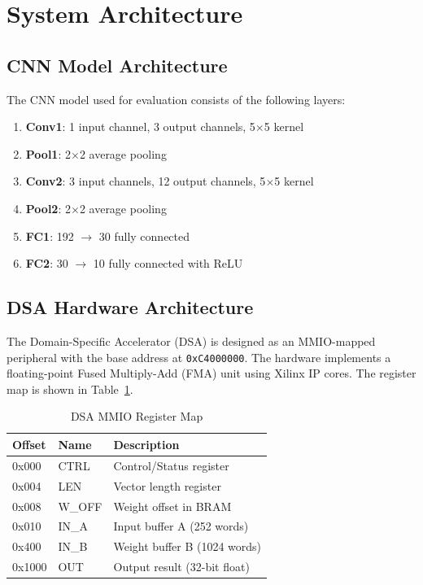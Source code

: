 \documentclass[conference]{IEEEtran}
\begin{document}
\section{System Architecture}


\subsection{CNN Model Architecture}

The CNN model used for evaluation consists of the following layers:

\begin{enumerate}
    \item \textbf{Conv1}: 1 input channel, 3 output channels, 5$\times$5 kernel
    \item \textbf{Pool1}: 2$\times$2 average pooling
    \item \textbf{Conv2}: 3 input channels, 12 output channels, 5$\times$5 kernel
    \item \textbf{Pool2}: 2$\times$2 average pooling
    \item \textbf{FC1}: 192 $\rightarrow$ 30 fully connected
    \item \textbf{FC2}: 30 $\rightarrow$ 10 fully connected with ReLU
\end{enumerate}

\subsection{DSA Hardware Architecture}

The Domain-Specific Accelerator (DSA) is designed as an MMIO-mapped peripheral with the base address at \texttt{0xC4000000}. The hardware implements a floating-point Fused Multiply-Add (FMA) unit using Xilinx IP cores. The register map is shown in Table~\ref{tab:mmio_reg}.

\begin{table}[htbp]
\caption{DSA MMIO Register Map}
\label{tab:mmio_reg}
\centering
\begin{tabular}{@{}lll@{}}
\toprule
Offset & Name & Description \\
\midrule
0x000 & CTRL & Control/Status register \\
0x004 & LEN & Vector length register \\
0x008 & W\_OFF & Weight offset in BRAM \\
0x010 & IN\_A & Input buffer A (252 words) \\
0x400 & IN\_B & Weight buffer B (1024 words) \\
0x1000 & OUT & Output result (32-bit float) \\
\bottomrule
\end{tabular}
\end{table}
\end{document}
